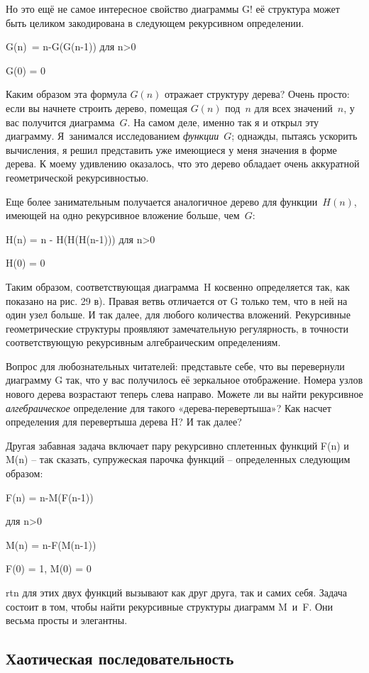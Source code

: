 \documentclass[../main.tex]{subfiles}
\begin{document}
Но это ещё не самое интересное свойство диаграммы G! её структура может быть целиком закодирована в следующем рекурсивном определении.

G(n)~= n-G(G(n-1)) для n\textgreater0

G(0) = 0

Каким образом эта формула $G(n)$ отражает структуру дерева? Очень просто: если вы начнете строить дерево, помещая $G(n)$ под~$n$ для всех значений~$n$, у вас получится диаграмма~$G$. На самом деле, именно так я и открыл эту диаграмму. Я~занимался исследованием \emph{функции}~$G$; однажды, пытаясь ускорить вычисления, я решил представить уже имеющиеся у меня значения в форме дерева. К моему удивлению оказалось, что это дерево обладает очень аккуратной геометрической рекурсивностью.

Еще более занимательным получается аналогичное дерево для функции~$H(n)$, имеющей на одно рекурсивное вложение больше, чем~$G$:

H(n) = n - H(H(H(n-1))) для n\textgreater0

H(0) = 0

Таким образом, соответствующая диаграмма~H косвенно определяется так, как показано на рис. 29 в). Правая ветвь отличается от G только тем, что в ней на один узел больше. И так далее, для любого количества вложений. Рекурсивные геометрические структуры проявляют замечательную регулярность, в точности соответствующую рекурсивным алгебраическим определениям.

Вопрос для любознательных читателей: представьте себе, что вы перевернули диаграмму G так, что у вас получилось её зеркальное отображение. Номера узлов нового дерева возрастают теперь слева направо. Можете ли вы найти рекурсивное \emph{алгебраическое} определение для такого «дерева-перевертыша»? Как насчет определения для перевертыша дерева H? И так далее?

Другая забавная задача включает пару рекурсивно сплетенных функций F(n) и M(n) \--- так сказать, супружеская парочка функций \--- определенных следующим образом:

F(n) = n-M(F(n-1))

для n\textgreater0

M(n) = n-F(M(n-1))

F(0) = 1, M(0) = 0

\Acs{rtn} для этих двух функций вызывают как друг друга, так и самих себя. Задача состоит в том, чтобы найти рекурсивные структуры диаграмм M~и~F\@. Они весьма просты и элегантны.


\subsection{Хаотическая последовательность}
\end{document}
